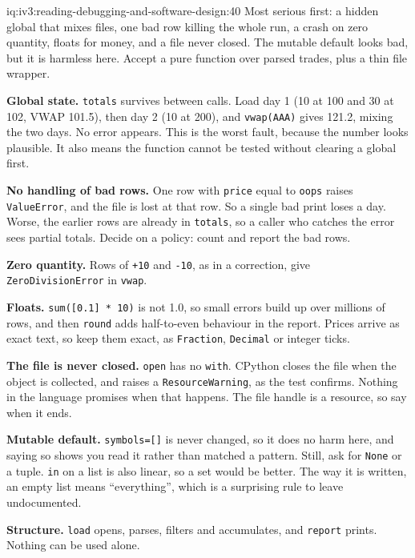 \begin{solution}{iq:iv3:reading-debugging-and-software-design:40}
Most serious first: a hidden global that mixes files, one bad row killing the whole run, a crash on zero quantity, floats for money, and a file never closed. The mutable default looks bad, but it is harmless here. Accept a pure function over parsed trades, plus a thin file wrapper.

\textbf{Global state.} \texttt{totals} survives between calls. Load day 1 (10 at 100 and 30 at 102, VWAP 101.5), then day 2 (10 at 200), and \texttt{vwap(\textquotedbl{}AAA\textquotedbl{})} gives 121.2, mixing the two days. No error appears. This is the worst fault, because the number looks plausible. It also means the function cannot be tested without clearing a global first.

\textbf{No handling of bad rows.} One row with \texttt{price} equal to \texttt{oops} raises \texttt{ValueError}, and the file is lost at that row. So a single bad print loses a day. Worse, the earlier rows are already in \texttt{totals}, so a caller who catches the error sees partial totals. Decide on a policy: count and report the bad rows.

\textbf{Zero quantity.} Rows of \texttt{+10} and \texttt{-10}, as in a correction, give \texttt{ZeroDivisionError} in \texttt{vwap}.

\textbf{Floats.} \texttt{sum([0.1] * 10)} is not 1.0, so small errors build up over millions of rows, and then \texttt{round} adds half-to-even behaviour in the report. Prices arrive as exact text, so keep them exact, as \texttt{Fraction}, \texttt{Decimal} or integer ticks.

\textbf{The file is never closed.} \texttt{open} has no \texttt{with}. CPython closes the file when the object is collected, and raises a \texttt{ResourceWarning}, as the test confirms. Nothing in the language promises when that happens. The file handle is a resource, so say when it ends.

\textbf{Mutable default.} \texttt{symbols=[]} is never changed, so it does no harm here, and saying so shows you read it rather than matched a pattern. Still, ask for \texttt{None} or a tuple. \texttt{in} on a list is also linear, so a set would be better. The way it is written, an empty list means ``everything'', which is a surprising rule to leave undocumented.

\textbf{Structure.} \texttt{load} opens, parses, filters and accumulates, and \texttt{report} prints. Nothing can be used alone.


\end{solution}
